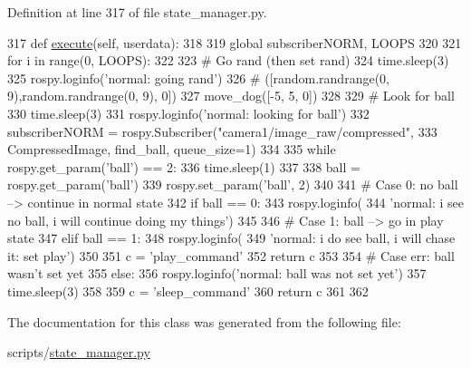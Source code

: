 Definition at line 317 of file state\+\_\+manager.\+py.


\begin{DoxyCode}
317     \textcolor{keyword}{def }\hyperlink{classstate__manager_1_1MIRO__Normal_a4133da39ee6ec170623fc1d457b0729a}{execute}(self, userdata):
318 
319         \textcolor{keyword}{global} subscriberNORM, LOOPS
320 
321         \textcolor{keywordflow}{for} i \textcolor{keywordflow}{in} range(0, LOOPS):
322 
323             \textcolor{comment}{# Go rand (then set rand)}
324             time.sleep(3)
325             rospy.loginfo(\textcolor{stringliteral}{'normal: going rand'})
326             \textcolor{comment}{# ([random.randrange(0, 9),random.randrange(0, 9), 0])}
327             move\_dog([-5, 5, 0])
328 
329             \textcolor{comment}{# Look for ball}
330             time.sleep(3)
331             rospy.loginfo(\textcolor{stringliteral}{'normal: looking for ball'})
332             subscriberNORM = rospy.Subscriber(\textcolor{stringliteral}{"camera1/image\_raw/compressed"},
333                                               CompressedImage, find\_ball,  queue\_size=1)
334 
335             \textcolor{keywordflow}{while} rospy.get\_param(\textcolor{stringliteral}{'ball'}) == 2:
336                 time.sleep(1)
337 
338             ball = rospy.get\_param(\textcolor{stringliteral}{'ball'})
339             rospy.set\_param(\textcolor{stringliteral}{'ball'}, 2)
340 
341             \textcolor{comment}{# Case 0: no ball --> continue in normal state}
342             \textcolor{keywordflow}{if} ball == 0:
343                 rospy.loginfo(
344                     \textcolor{stringliteral}{'normal: i see no ball, i will continue doing my things'})
345 
346             \textcolor{comment}{# Case 1: ball --> go in play state}
347             \textcolor{keywordflow}{elif} ball == 1:
348                 rospy.loginfo(
349                     \textcolor{stringliteral}{'normal: i do see ball, i will chase it: set play'})
350 
351                 c = \textcolor{stringliteral}{'play\_command'}
352                 \textcolor{keywordflow}{return} c
353 
354             \textcolor{comment}{# Case err: ball wasn't set yet}
355             \textcolor{keywordflow}{else}:
356                 rospy.loginfo(\textcolor{stringliteral}{'normal: ball was not set yet'})
357                 time.sleep(3)
358 
359         c = \textcolor{stringliteral}{'sleep\_command'}
360         \textcolor{keywordflow}{return} c
361 
362 
\end{DoxyCode}


The documentation for this class was generated from the following file\+:\begin{DoxyCompactItemize}
\item 
scripts/\hyperlink{state__manager_8py}{state\+\_\+manager.\+py}\end{DoxyCompactItemize}
